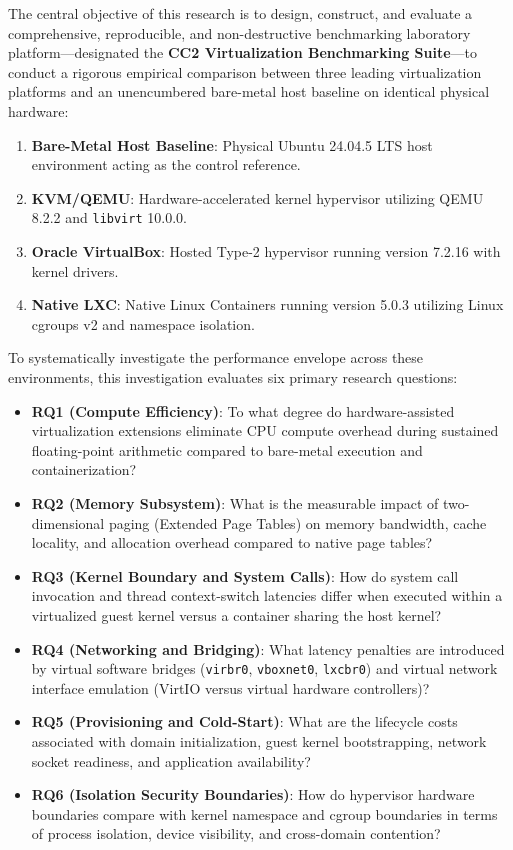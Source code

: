 The central objective of this research is to design, construct, and evaluate a comprehensive, reproducible, and non-destructive benchmarking laboratory platform—designated the \textbf{CC2 Virtualization Benchmarking Suite}—to conduct a rigorous empirical comparison between three leading virtualization platforms and an unencumbered bare-metal host baseline on identical physical hardware:
\begin{enumerate}
    \item \textbf{Bare-Metal Host Baseline}: Physical Ubuntu 24.04.5 LTS host environment acting as the control reference.
    \item \textbf{KVM/QEMU}: Hardware-accelerated kernel hypervisor utilizing QEMU 8.2.2 and \texttt{libvirt} 10.0.0.
    \item \textbf{Oracle VirtualBox}: Hosted Type-2 hypervisor running version 7.2.16 with kernel drivers.
    \item \textbf{Native LXC}: Native Linux Containers running version 5.0.3 utilizing Linux cgroups v2 and namespace isolation.
\end{enumerate}

To systematically investigate the performance envelope across these environments, this investigation evaluates six primary research questions:
\begin{itemize}
    \item \textbf{RQ1 (Compute Efficiency)}: To what degree do hardware-assisted virtualization extensions eliminate CPU compute overhead during sustained floating-point arithmetic compared to bare-metal execution and containerization?
    \item \textbf{RQ2 (Memory Subsystem)}: What is the measurable impact of two-dimensional paging (Extended Page Tables) on memory bandwidth, cache locality, and allocation overhead compared to native page tables?
    \item \textbf{RQ3 (Kernel Boundary and System Calls)}: How do system call invocation and thread context-switch latencies differ when executed within a virtualized guest kernel versus a container sharing the host kernel?
    \item \textbf{RQ4 (Networking and Bridging)}: What latency penalties are introduced by virtual software bridges (\texttt{virbr0}, \texttt{vboxnet0}, \texttt{lxcbr0}) and virtual network interface emulation (VirtIO versus virtual hardware controllers)?
    \item \textbf{RQ5 (Provisioning and Cold-Start)}: What are the lifecycle costs associated with domain initialization, guest kernel bootstrapping, network socket readiness, and application availability?
    \item \textbf{RQ6 (Isolation Security Boundaries)}: How do hypervisor hardware boundaries compare with kernel namespace and cgroup boundaries in terms of process isolation, device visibility, and cross-domain contention?
\end{itemize}

